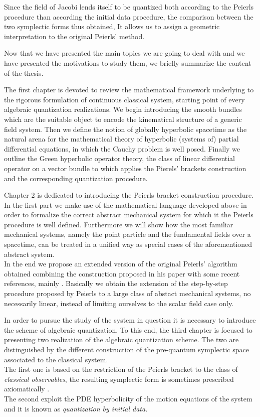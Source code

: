 \documentclass[Main]{subfiles}
\begin{document}
Since the field of Jacobi lends itself to be quantized both according to the Peierls procedure than according the initial data procedure,
the comparison between the two symplectic forms thus obtained,
It allows us to assign a geometric interpretation to the original Peierls' method.

\vspace{3mm}
Now that we have presented the main topics we are going to deal with and we have presented the motivations to study them, we briefly summarize the content of the thesis.

The first chapter is devoted to review the mathematical framework  underlying to the rigorous formulation of continuous classical system, starting point of every algebraic quantization realizations.
We begin introducing the smooth bundles which are the suitable object to encode the kinematical structure of a generic field system.
Then we define the notion of globally hyperbolic spacetime as  the natural arena for the mathematical theory of hyperbolic (systems of) partial differential equations, in which the Cauchy problem is well posed.
Finally we outline the Green hyperbolic operator theory, the class of linear differential operator on a vector bundle to which applies the Pierels' brackets construction and the corresponding quantization procedure.

Chapter 2 is dedicated to introducing the Peierls bracket construction procedure.
In the first part we make use of the mathematical language developed above in order to formalize the correct abstract mechanical system for which it the Peierls procedure is well defined. Furthermore we will show how the most familiar mechanical systems, namely the point particle and the fundamental fields over a spacetime, can be treated in a unified way as special cases of the aforementioned abstract system.
\\
In the end we propose an extended version of the original Peierls' algorithm obtained combining the construction proposed in his paper\cite{Peierls1952} with some recent references, mainly \cite{Marolf1993}\cite{Dewitt1999}\cite{Forger2005}\cite{Sharan2010}\cite{Khavkine2014}.
Basically we obtain the extension of the step-by-step procedure proposed by Peierls to a large class of abstact mechanical systems, no necessarily linear, instead of limiting ourselves to the scalar field case only.

In order to pursue the study of the system in question it is necessary to introduce the scheme of algebraic quantization.
To this end, the third chapter is focused to presenting two realization of the algebraic quantization scheme.
The two are distinguished by the different construction of the pre-quantum symplectic space associated to the classical system.
\\
The first one is based on the restriction of the Peierls bracket to the class of \emph{classical observables}, the resulting symplectic form is sometimes prescribed axiomatically \cite{Dewitt1999}\cite{Esposito}\cite{Benini}.\\
The second exploit the PDE hyperbolicity of the motion equations of the system and it is known as \emph{quantization by initial data}\cite{Wald1994}.
\end{document}
